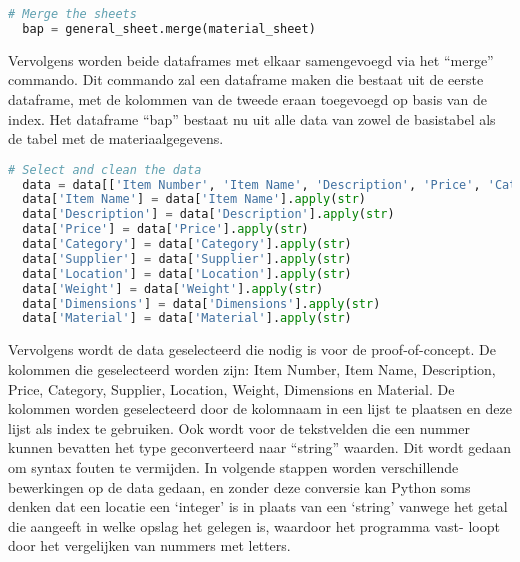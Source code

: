 \begin{lstlisting}[language=Python, caption={Het mergen van twee dataframes.}]
  # Merge the sheets
  bap = general_sheet.merge(material_sheet)
\end{lstlisting}

Vervolgens worden beide dataframes met elkaar samengevoegd via het “merge” commando. Dit commando zal een dataframe maken die bestaat uit de eerste dataframe, met de kolommen van de tweede eraan toegevoegd op basis van de index. Het dataframe “bap” bestaat nu uit alle data van zowel de basistabel als de tabel met de materiaalgegevens.

\begin{lstlisting}[language=Python, caption={Het mergen van twee dataframes.}]
  # Select and clean the data
  data = data[['Item Number', 'Item Name', 'Description', 'Price', 'Category', 'Supplier', 'Location', 'Weight', 'Dimensions', 'Material']]
  data['Item Name'] = data['Item Name'].apply(str)
  data['Description'] = data['Description'].apply(str)
  data['Price'] = data['Price'].apply(str)
  data['Category'] = data['Category'].apply(str)
  data['Supplier'] = data['Supplier'].apply(str)
  data['Location'] = data['Location'].apply(str)
  data['Weight'] = data['Weight'].apply(str)
  data['Dimensions'] = data['Dimensions'].apply(str)
  data['Material'] = data['Material'].apply(str)
\end{lstlisting}

Vervolgens wordt de data geselecteerd die nodig is voor de proof-of-concept. De kolommen die geselecteerd worden zijn: Item Number, Item Name, Description, Price, Category, Supplier, Location, Weight, Dimensions en Material. De kolommen worden geselecteerd door de kolomnaam in een lijst te plaatsen en deze lijst als index te gebruiken. 
Ook wordt voor de tekstvelden die een nummer kunnen bevatten het type geconverteerd naar “string” waarden. Dit wordt gedaan om syntax fouten te vermijden. In volgende stappen worden verschillende bewerkingen op de data gedaan, en zonder deze conversie kan Python soms denken dat een locatie een ‘integer’ is in plaats van een ‘string’ vanwege het getal die aangeeft in welke opslag het gelegen is, waardoor het programma vast- loopt door het vergelijken van nummers met letters.